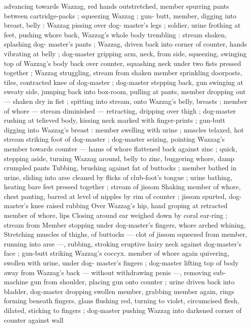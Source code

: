 {advancing towards Wazzag, red hands outstretched, member 
spurring pants between cartridge-packs ; squeezing Wazzag ; gun- 
butt, member, digging into breast, belly : Wazzag pissing over dog- 
master's legs ; soldier, urine frothing at feet, pushing whore back, 
Wazzag's whole body trembling : stream shaken, splashing dog- 
master's pants ; Wazzag, driven back into corner of counter, hands 
vibrating at belly ; dog-master gripping arm, neck, from side, 
squeezing, swinging top of Wazzag's body back over counter, 
squashing neck under two fists pressed together ; Wazzag 
struggling, stream from shaken member sprinkling doorposts, tiles, 
contracted knee of dog-master ; dog-master stepping back, gun 
swinging at sweaty side, jumping back into box-room, pulling at 
pants, member dropping out --- shaken dry in fist ; spitting into 
stream, onto Wazzag's belly, breasts ; member of whore --- stream 
diminished --- retracting, dripping over thigh ; dog-master rushing at 
telieved body, kissing neck marked with finger-prints ; gun-butt 
digging into Wazzag's breast : member swelling with urine ; muscles 
telaxed, hot stream striking foot of dog-master ; dog-master seizing, 
pointing Wazzag's member towards counter --- hams of whore 
flattened back against zinc ; quick, stepping aside, turning Wazzag 
around, belly to zinc, buggering whore, damp crumpled pants 
Tubbing, brushing against fat of buttocks ; member bathed in urine, 
sliding into arse cleaned by flicks of club-foot's tongue ; urine 
bathing, heating bare feet pressed together ; stream of jissom 
Shaking member of whore, chest panting, barred at level of nipples 
by rim of counter ; jissom spurted, dog-master's knee raised rubbing 
Over Wazzag's hip, hand groping at retracted member of whore, lips 
Closing around ear weighed down by coral ear-ring ; stream from 
Member stopping under dog-master's fingers, whore arched whining, 
Stretching muscles of thighs, of buttocks --- clot of jissom squeezed 
from member, running into arse ---, rubbing, stroking eruptive hairy 
neck against dog-master's face ; gun-butt striking Wazzag's coccyx. 
member of whore again quivering, swollen with urine, under dog- 
master's fingers ; dog-master lifting top of body away from Wazzag's 
back --- without withdrawing penis ---, removing sub-machine gun 
from shoulder, placing gun onto counter ; urine driven back into 
bladder, dog-master dropping swollen member, grabbing member 
again, rings forming beneath fingers, glans flushing red, turning to 
violet, circumcised flesh, dilated, sticking to fingers ; dog-master 
pushing Wazzag into darkened corner of counter against wall 
}
